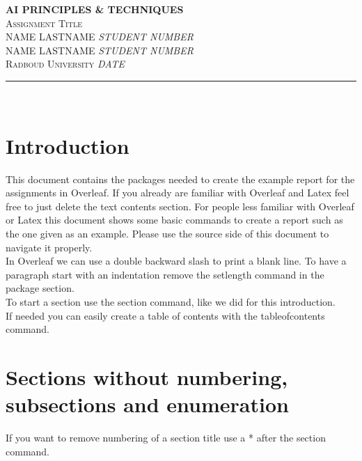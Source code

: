 \documentclass{article}
\begin{document}

\begin{center}
\scshape
	\large{\textbf{AI PRINCIPLES \& TECHNIQUES}}\\[5mm]
	\large{Assignment Title}\\[5mm]
	\normalsize{NAME LASTNAME \hfill \textit{STUDENT NUMBER}}\\
	\normalsize{NAME LASTNAME \hfill \textit{STUDENT NUMBER}}\\
	\normalsize{Radboud University \hfill \textit{DATE}}	\rule{\textwidth}{0.4pt} \\
	\vspace{0.3\baselineskip}
\end{center}


\section{Introduction}
This document contains the packages needed to create the example report for the assignments in Overleaf. If you already are familiar with Overleaf and Latex feel free to just delete the text contents section. For people less familiar with Overleaf or Latex this document shows some basic commands to create a report such as the one given as an example. Please use the source side of this document to navigate it properly.\\

In Overleaf we can use a double backward slash to print a blank line. To have a paragraph start with an indentation remove the setlength command in the package section.\\

To start a section use the section command, like we did for this introduction.\\

If needed you can easily create a table of contents with the tableofcontents command.
\tableofcontents

\newpage

\section*{Sections without numbering, subsections and enumeration}
If you want to remove numbering of a section title use a * after the section command.\\
\end{document}

